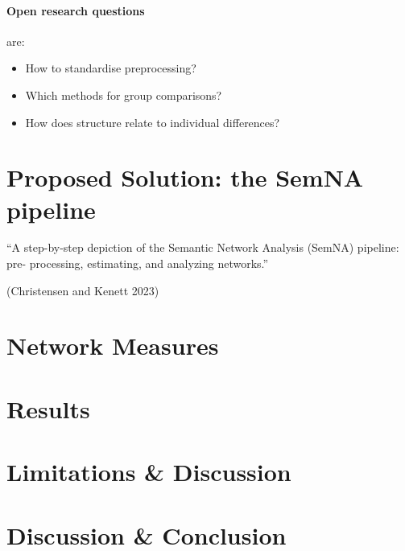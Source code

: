 \paragraph{Open research questions} are: 
\begin{itemize}
    \item How to standardise preprocessing?
    \item Which methods for group comparisons?
    \item How does structure relate to individual differences?
\end{itemize}

\section{Proposed Solution: the SemNA pipeline}\label{sec:proposed-solution}
\begin{center}
    ``A step-by-step depiction of the Semantic Network Analysis (SemNA) pipeline: pre-
    processing, estimating, and analyzing networks.''
\end{center}
(Christensen and Kenett 2023)


\section{Network Measures}\label{sec:network-measures}


\section{Results}\label{sec:results}


\section{Limitations \& Discussion}\label{sec:limitations-&-discussion}


\section{Discussion \& Conclusion}\label{sec:discussion-&-conclusion}